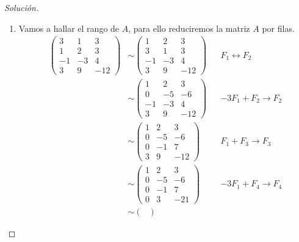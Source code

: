 \documentclass[a4,11pt]{aleph-notas}
\begin{document}
\begin{proof}[Solución]\hspace{0pt}
    \begin{enumerate}
    \item 
        Vamos a hallar el rango de $A$, para ello reduciremos la matriz $A$ por filas.
        \begin{align*}
            \begin{pmatrix}
            3 & 1 & 3\\
            1 & 2 & 3\\
            -1 & -3 & 4\\
            3 & 9 & -12
            \end{pmatrix} & \sim 
            \begin{pmatrix}
            1 & 2 & 3\\
            3 & 1 & 3\\
            -1 & -3 & 4\\
            3 & 9 & -12
            \end{pmatrix} &&
            F_1 \leftrightarrow F_2\\
            & \sim 
            \begin{pmatrix}
            1 & 2 & 3\\
            0 & -5 & -6\\
            -1 & -3 & 4\\
            3 & 9 & -12
            \end{pmatrix} &&
            -3F_1 + F_2 \to F_2\\ 
            & \sim 
            \begin{pmatrix}
            1 & 2 & 3\\
            0 & -5 & -6\\
            0 & -1 & 7\\
            3 & 9 & -12
            \end{pmatrix} &&
            F_1 + F_3 \to F_3\\  
            & \sim 
            \begin{pmatrix}
            1 & 2 & 3\\
            0 & -5 & -6\\
            0 & -1 & 7\\
            0 & 3 & -21
            \end{pmatrix} &&
            -3F_1 + F_4 \to F_4\\
            & \sim 
            \begin{pmatrix}

\end{pmatrix}
\end{align*}
\end{enumerate}
\end{proof}
\end{document}
